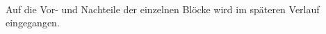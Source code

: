 \documentclass{article}
\begin{document}
    \\
    Auf die Vor- und Nachteile der einzelnen Blöcke wird im späteren Verlauf eingegangen.

    \newpage
\end{document}
